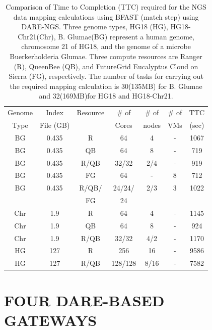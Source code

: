 \documentclass{sig-alternate}
\begin{document}
 \begin{table}
\scriptsize
 \begin{tabular}{|c|c|c|c|c|c|c|} 
 \hline 
Genome & Index         & Resource    & \# of & \# of &   \# of         &	TTC  \\
  Type               & File (GB)        & &Cores &   nodes &  VMs&  (sec)\\  
  \hline
 BG &0.435& R&	64 &4&-	&1067 \\
\hline                  
BG &0.435& QB	&	64& 8&-	&719 \\
\hline
 BG &0.435&R/QB	&	32/32 &2/4& -&919 \\
\hline
 BG &0.435& FG &	64 &-&8	&712 \\
\hline
 BG &0.435 &  R/QB/ &	24/24/& 2/3 & 3 &1022\\
 & & FG& 24 &&&\\
\hline
\hline
Chr &1.9& R	&	64& 4 &-&1145 \\
\hline
Chr &1.9& QB	&	64&8&-	&924 \\
\hline
Chr &1.9& R/QB	&	32/32& 4/2&	-&1170 \\
\hline
\hline
HG &127& R	&	256 & 16 &-	&9586\\
\hline
HG &127& R/QB	&	128/128&8/16 & -&7582 \\
\hline
\end{tabular}
\caption{
  Comparison of Time to Completion (TTC) required for the NGS data
  mapping calculations using BFAST (match step) using DARE-NGS.  
  Three genome types,
  HG18 (HG), HG18-Chr21(Chr), B. Glumae(BG) represent a human genome,
  chromosome 21 of HG18, and the genome of a microbe Buerkerholderia
  Glumae.  Three compute resources are Ranger (R), QueenBee (QB), and
  FutureGrid  Eucalyptus Cloud on Sierra (FG), respectively.  The
  number of tasks for carrying out the required mapping calculation is
  30(135MB) for B. Glumae and 32(169MB)for HG18 and HG18-Chr21.
}

  \label{table:NGS-Distributed} 
\end{table}




\section{FOUR DARE-BASED GATEWAYS}
\end{document}
